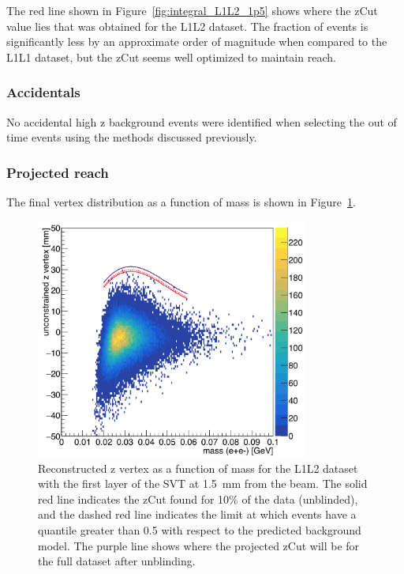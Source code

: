The red line shown in Figure~\ref{fig:integral_L1L2_1p5} shows where the zCut value lies that was obtained for the L1L2 dataset. The fraction of events is significantly less by an approximate order of magnitude when compared to the L1L1 dataset, but the zCut seems well optimized to maintain reach.

\subsubsection{Accidentals}

No accidental high z background events were identified when selecting the out of time events using the methods discussed previously. 

\subsubsection{Projected reach}

The final vertex distribution as a function of mass is shown in Figure~\ref{fig:zVm_L1L2_1p5}. 
\begin{figure}[H]
  \centering
     \includegraphics[width=0.8\textwidth]{plots/zVm_L1L2_1p5.png}
  \caption{Reconstructed z vertex as a function of mass for the L1L2 dataset with the first layer of the SVT at 1.5~mm from the beam. The solid red line indicates the zCut found for 10$\%$ of the data (unblinded), and the dashed red line indicates the limit at which events have a quantile greater than 0.5 with respect to the predicted background model. The purple line shows where the projected zCut will be for the full dataset after unblinding.}
  \label{fig:zVm_L1L2_1p5}
\end{figure} 

